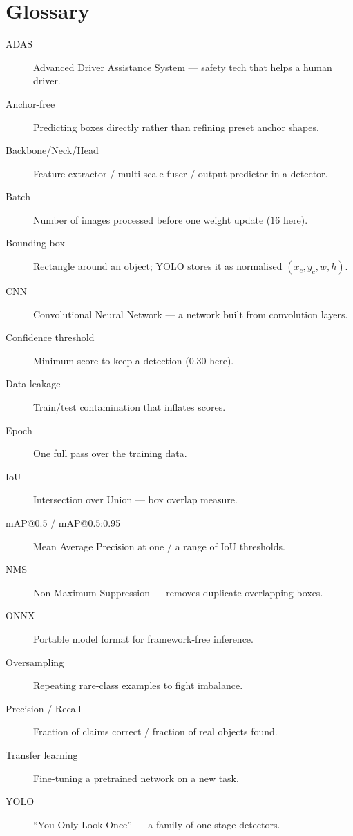 \chapter*{Glossary}
\begin{description}
  \item[ADAS] Advanced Driver Assistance System --- safety tech that
        helps a human driver.
  \item[Anchor-free] Predicting boxes directly rather than refining
        preset anchor shapes.
  \item[Backbone/Neck/Head] Feature extractor / multi-scale fuser /
        output predictor in a detector.
  \item[Batch] Number of images processed before one weight update
        ($16$ here).
  \item[Bounding box] Rectangle around an object; YOLO stores it as
        normalised $(x_c,y_c,w,h)$.
  \item[CNN] Convolutional Neural Network --- a network built from
        convolution layers.
  \item[Confidence threshold] Minimum score to keep a detection
        ($0.30$ here).
  \item[Data leakage] Train/test contamination that inflates scores.
  \item[Epoch] One full pass over the training data.
  \item[IoU] Intersection over Union --- box overlap measure.
  \item[mAP@0.5 / mAP@0.5:0.95] Mean Average Precision at one / a range
        of IoU thresholds.
  \item[NMS] Non-Maximum Suppression --- removes duplicate overlapping
        boxes.
  \item[ONNX] Portable model format for framework-free inference.
  \item[Oversampling] Repeating rare-class examples to fight imbalance.
  \item[Precision / Recall] Fraction of claims correct / fraction of real
        objects found.
  \item[Transfer learning] Fine-tuning a pretrained network on a new
        task.
  \item[YOLO] ``You Only Look Once'' --- a family of one-stage detectors.
\end{description}


